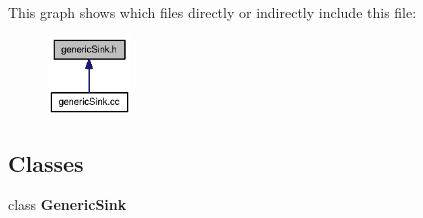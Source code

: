 This graph shows which files directly or indirectly include this file:\nopagebreak
\begin{figure}[H]
\begin{center}
\leavevmode
\includegraphics[width=62pt]{genericSink_8h__dep__incl}
\end{center}
\end{figure}
\subsection*{Classes}
\begin{CompactItemize}
\item 
class {\bf GenericSink}
\end{CompactItemize}

